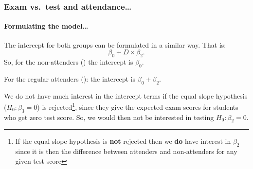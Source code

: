 \documentclass{beamer}\usepackage[]{graphicx}\usepackage[]{xcolor}
\makeatletter
\newcommand{\hlopt}[1]{\textcolor[rgb]{0,0,0}{#1}}%
\newcommand{\hlstd}[1]{\textcolor[rgb]{0.345,0.345,0.345}{#1}}%
\newcommand{\hlkwb}[1]{\textcolor[rgb]{0.69,0.353,0.396}{#1}}%
\newcommand{\hlkwc}[1]{\textcolor[rgb]{0.333,0.667,0.333}{#1}}%
\newcommand{\hlkwd}[1]{\textcolor[rgb]{0.737,0.353,0.396}{\textbf{#1}}}%
\newenvironment{kframe}{%
 \def\at@end@of@kframe{}%
 \ifinner\ifhmode%
  \def\at@end@of@kframe{\end{minipage}}%
  \begin{minipage}{\columnwidth}%
 \fi\fi%
 \def\FrameCommand##1{\hskip\@totalleftmargin \hskip-\fboxsep
 \colorbox{shadecolor}{##1}\hskip-\fboxsep
     \hskip-\linewidth \hskip-\@totalleftmargin \hskip\columnwidth}%
 \MakeFramed {\advance\hsize-\width
   \@totalleftmargin\z@ \linewidth\hsize
   \@setminipage}}%
 {\par\unskip\endMakeFramed%
 \at@end@of@kframe}
\newenvironment{knitrout}{}{} %
\makeatother
\begin{document}
\begin{frame}[fragile]
\frametitle{Exam vs.\ test \textbf{and} attendance\ldots}
\framesubtitle{Formulating the model\ldots}
The intercept for both groups can be formulated in a similar way. That is: 
\[
\beta_0+D \times \beta_2.
\]
\medskip
So, for the non-attenders () the intercept is $\beta_0$. 

\medskip
For the regular attenders (): the intercept is $\beta_0+\beta_2$.

\bigskip
We do not have much interest in the intercept terms if the equal slope hypothesis ($H_0: \beta_3=0$) is rejected\footnote{If the equal slope hypothesis is {\bf not} rejected then we {\bf do} have interest in $\beta_2$ since it is then the difference between attenders and non-attenders for any given test score}, since they give the expected exam scores for students who get zero test score. So, we would then not be interested in testing $H_0: \beta_2=0$.

\end{frame}


\end{document}
